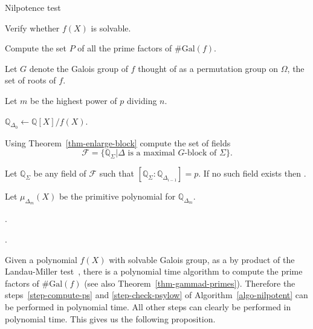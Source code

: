 \documentclass[11pt]{madras}%
\theoremstyle{remark}
\newcommand{\Gal}[1]{{\ensuremath{\mathrm{Gal}\left(#1\right)}}}
\begin{document}
\begin{algorithm}
  \caption{Nilpotence test}\label{algo-nilpotent}

  Verify whether $f(X)$ is solvable.

   Compute the set $P$ of all the prime factors
  of $\# \Gal{f}$.

  Let $G$ denote the Galois group of $f$ thought of as a permutation
  group on $\Omega$, the set of roots of $f$.
  
   {

    
    Let $m$ be the highest power of $p$ dividing $n$.
    
    $\mathbb{Q}_{\Delta_0} \leftarrow \mathbb{Q}[X]/f(X)$.

    {
     
      Using Theorem~\ref{thm-enlarge-block} compute the set of fields
      \[ \mathcal{F} = \{ \mathbb{Q}_\Sigma | \Delta \textrm{ is a
        maximal } G\textrm{-block of }\Sigma \}.
      \]

      Let $\mathbb{Q}_\Sigma$ be any field of $\mathcal{F}$ such that
      $[\mathbb{Q}_{\Sigma} : \mathbb{Q}_{\Delta_{i-1}}] = p$. If no
      such field exists then .



    }
  
    
    Let $\mu_{\Delta_m}(X)$ be the primitive polynomial for
    $\mathbb{Q}_{\Delta_m}$.

    \lIf{$p$ divides $\# \Gal{\mu_{\Delta_m}}$}
    { 
      .
    }
  }

  .

\end{algorithm}

Given a polynomial $f(X)$ with solvable Galois group, as a by product
of the Landau-Miller test~\cite{landau85solvability}, there is a
polynomial time algorithm to compute the prime factors of $\# \Gal{f}$
(see also Theorem~\ref{thm-gammad-primes}).  Therefore the
steps~\ref{step-compute-ps} and \ref{step-check-psylow} of
Algorithm~\ref{algo-nilpotent} can be performed in polynomial time.
All other steps can clearly be performed in polynomial time.  This
gives us the following proposition.
\end{document}
